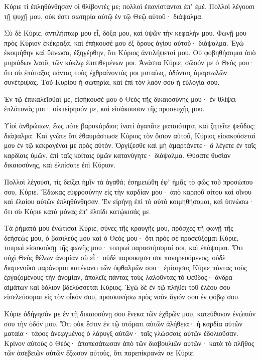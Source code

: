 \begin{spacing}{1.1}
\begin{multicols}{2}
Κύριε τί ἐπληθύνθησαν οἱ θλίβοντές με; πολλοὶ ἐπανίστανται ἐπʼ ἐμέ.
Πολλοὶ λέγουσι τῇ ψυχῇ μου, οὐκ ἔστι σωτηρία αὐτῷ ἐν τῷ Θεῷ αὐτοῦ· διάψαλμα.

Σὺ δὲ Κύριε, ἀντιλήπτωρ μου εἶ, δόξα μου, καὶ ὑψῶν τὴν κεφαλήν μου.
Φωνῇ μου πρὸς Κύριον ἐκέκραξα, καὶ ἐπήκουσέ μου ἐξ ὄρους ἁγίου αὐτοῦ· διάψαλμα.
Ἐγὼ ἐκοιμήθην καὶ ὕπνωσα, ἐξηγέρθην, ὅτι Κύριος ἀντιλήψεταί μου.
Οὐ φοβηθήσομαι ἀπὸ μυριάδων λαοῦ, τῶν κύκλῳ ἐπιτιθεμένων μοι.
Ἀνάστα Κύριε, σῶσόν με ὁ Θεός μου· ὅτι σὺ ἐπάταξας πάντας τοὺς ἐχθραίνοντάς μοι ματαίως, ὀδόντας ἁμαρτωλῶν συνέτριψας.
Τοῦ Κυρίου ἡ σωτηρία, καὶ ἐπὶ τὸν λαόν σου ἡ εὐλογία σου.

Ἐν τῷ ἐπικαλεῖσθαί με, εἰσήκουσέ μου ὁ Θεὸς τῆς δικαιοσύνης μου· ἐν θλίψει ἐπλάτυνάς μοι· οἰκτείρησόν με, καὶ εἰσάκουσον τῆς προσευχῆς μου.

Υἱοὶ ἀνθρώπων, ἕως πότε βαρυκάρδιοι; ἱνατί ἀγαπᾶτε ματαιότητα, καὶ ζητεῖτε ψεῦδος; διάψαλμα.
Καὶ γνῶτε ὅτι ἐθαυμάστωσε Κύριος τὸν ὅσιον αὐτοῦ, Κύριος εἰσακούσεταί μου ἐν τῷ κεκραγέναι με πρὸς αὐτόν.
Ὀργίζεσθε καὶ μὴ ἁμαρτάνετε· ἃ λέγετε ἐν ταῖς καρδίαις ὑμῶν, ἐπὶ ταῖς κοίταις ὑμῶν κατανύγητε· διάψαλμα.
Θύσατε θυσίαν δικαιοσύνης, καὶ ἐλπίσατε ἐπὶ Κύριον.

Πολλοὶ λέγουσι, τίς δείξει ἡμῖν τὰ ἀγαθά; ἐσημειώθη ἐφʼ ἡμᾶς τὸ φῶς τοῦ προσώπου σου, Κύριε.
Ἔδωκας εὐφροσύνην εἰς τὴν καρδίαν μου· ἀπὸ καρποῦ σίτου καὶ οἴνου καὶ ἐλαίου αὐτῶν ἐπληθύνθησαν.
Ἐν εἰρήνῃ ἐπὶ τὸ αὐτὸ κοιμηθήσομαι, καὶ ὑπνώσω· ὅτι σὺ Κύριε κατὰ μόνας ἐπʼ ἐλπίδι κατῴκισάς με.

Τὰ ῥήματά μου ἐνώτισαι Κύριε, σύνες τῆς κραυγῆς μου,
πρόσχες τῇ φωνῇ τῆς δεήσεώς μου, ὁ βασιλεύς μου καὶ ὁ Θεός μου· ὅτι πρὸς σὲ προσεύξομαι Κύριε,
τοπρωῒ εἰσακούσῃ τῆς φωνῆς μου· τοπρωῒ παραστήσομαί σοι, καὶ ἐπόψομαι.
Ὅτι οὐχὶ Θεὸς θέλων ἀνομίαν σὺ εἶ· οὐδὲ παροικησει σοι πονηρευόμενος,
οὐδὲ διαμενοῦσι παράνομοι κατέναντι τῶν ὀφθαλμῶν σου· ἐμίσησας Κύριε πάντας τοὺς ἐργαζομένους τὴν ἀνομίαν,
ἀπολεῖς πάντας τοὺς λαλοῦντας τὸ ψεῦδος· ἄνδρα αἱμάτων καὶ δόλιον βδελύσσεται Κύριος.
Ἐγὼ δὲ ἐν τῷ πλήθει τοῦ ἐλέου σου εἰσελεύσομαι εἰς τὸν οἶκόν σου, προσκυνήσω πρὸς ναὸν ἅγιόν σου ἐν φόβῳ σου.

Κύριε ὁδήγησόν με ἐν τῇ δικαιοσύνῃ σου ἕνεκα τῶν ἐχθρῶν μου, κατεύθυνον ἐνώπιόν σου τὴν ὁδόν μου.
Ὅτι οὐκ ἔστιν ἐν τῷ στόματι αὐτῶν ἀλήθεια· ἡ καρδία αὐτῶν ματαία· τάφος ἀνεῳγμένος ὁ λάρυγξ αὐτῶν· ταῖς γλώσσαις αὐτῶν ἐδολιοῦσαν.
Κρίνον αὐτοὺς ὁ Θεός· ἀποπεσάτωσαν ἀπὸ τῶν διαβουλιῶν αὐτῶν· κατὰ τὸ πλῆθος τῶν ἀσεβειῶν αὐτῶν ἔξωσον αὐτοὺς, ὅτι παρεπίκρανάν σε Κύριε.


\end{multicols}
\end{spacing}
